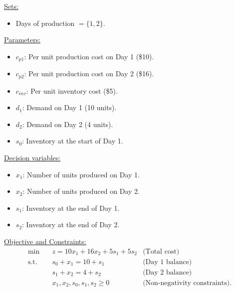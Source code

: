 \begin{solution}
 \underline{Sets:}
\begin{itemize}
    \item Days of production $ = \{1, 2\}$.
\end{itemize}
 \underline{Parameters:} 
\begin{itemize}
    \item $c_{p1}$: Per unit production cost on Day 1 (\$10).
    \item $c_{p2}$: Per unit production cost on Day 2 (\$16).
    \item $c_{inv}$: Per unit inventory cost (\$5).
    \item $d_1$: Demand on Day 1 (10 units).
    \item $d_2$: Demand on Day 2 (4 units).
        \item $s_0$: Inventory at the start of Day 1.
\end{itemize}

 \underline{Decision variables:} 
\begin{itemize}
    \item $x_1$: Number of units produced on Day 1.
    \item $x_2$: Number of units produced on Day 2.
    \item $s_1$: Inventory at the end of Day 1.
    \item $s_2$: Inventory at the end of Day 2.
\end{itemize}

\underline{Objective and Constraints:}
\begin{align*}
\min \quad & z = 10x_1 + 16x_2 + 5s_1 + 5s_2  & \text{(Total cost)} \\
\text{s.t.} \quad & s_0 + x_1 = 10 + s_1 & \text{(Day 1 balance)} \\
& s_1 + x_2 = 4 + s_2 & \text{(Day 2 balance)} \\
& x_1, x_2, s_0, s_1, s_2 \geq 0 & \text{(Non-negativity constraints)}.
\end{align*}

\end{solution}

